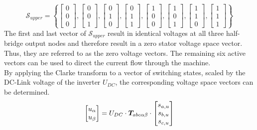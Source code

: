 \begin{equation}
	\mathcal{S}_{upper} = \left\{
	\begin{bmatrix}
		0 \\ 0\\ 0
	\end{bmatrix}, 
	\begin{bmatrix}
		0 \\ 0\\ 1
	\end{bmatrix},
	\begin{bmatrix}
		0 \\ 1\\ 0
	\end{bmatrix},
	\begin{bmatrix}
		0 \\ 1\\ 1
	\end{bmatrix},
	\begin{bmatrix}
		1 \\ 0\\ 0
	\end{bmatrix},
	\begin{bmatrix}
		1 \\ 0\\ 1
	\end{bmatrix},
	\begin{bmatrix}
		1 \\ 1\\ 0
	\end{bmatrix},
	\begin{bmatrix}
		1 \\ 1\\ 1
	\end{bmatrix}
	\right\}
    \label{equ:0_Supper}
\end{equation}
The first and last vector of $\mathcal{S}_{upper} $ result in identical voltages at all three half-bridge output nodes and therefore result in a zero stator voltage space vector. Thus, they are referred to as the zero voltage vectors. The remaining six active vectors can be used to direct the current flow through the machine.\\
By applying the Clarke transform to a vector of switching states, scaled by the DC-Link voltage of the inverter $U_{DC}$, the corresponding voltage space vectors can be determined.
\[
\begin{bmatrix}
	u_{\alpha} \\ u_{\beta}
\end{bmatrix} = 
U_{DC} \cdot \bm{T}_{abc \alpha \beta } \cdot
\begin{bmatrix}
	s_{a,u} \\ s_{b,u} \\ s_{c,u} 
\end{bmatrix}
\]
